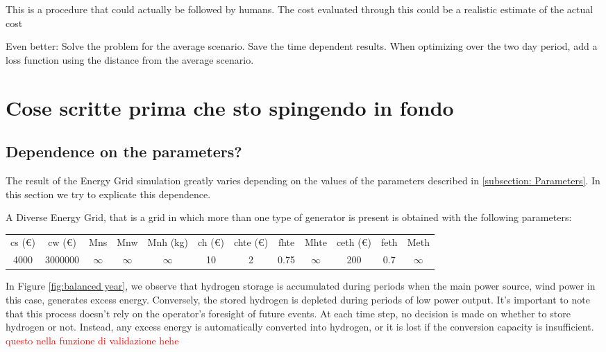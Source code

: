 \documentclass[english]{article}
\numberwithin{definition}{section}
\numberwithin{theorem}{section}
\numberwithin{problem}{section}
\begin{document}
This is a procedure that could actually be followed by humans. The cost evaluated through this could be a realistic estimate of the actual cost

Even better:
Solve the problem for the average scenario. Save the time dependent results. When optimizing over the two day period, add a loss function using the distance from the average scenario.



\newpage
\section{Cose scritte prima che sto spingendo in fondo}
\subsection{Dependence on the parameters?}
The result of the Energy Grid simulation greatly varies depending on the values of the parameters described in \ref{subsection: Parameters}. In this section we try to explicate this dependence.

A Diverse Energy Grid, that is a grid in which more than one type of generator is present is obtained with the following parameters:

\begin{center}
\begin{tabular}{ c c c c c c c c c c c c }

 cs (€)& cw (€)& Mns& Mnw& Mnh (kg)& ch (€)& chte (€)& fhte& Mhte& ceth (€)& feth& Meth \\ 
 4000 & 3000000 & \(\infty\) & \(\infty\) & \(\infty\) & 10 & 2 & 0.75 & \(\infty\) & 200 & 0.7 & \(\infty\) \\  
\end{tabular}
\end{center}

In Figure \ref{fig:balanced year}, we observe that hydrogen storage is accumulated during periods when the main power source, wind power in this case, generates excess energy. Conversely, the stored hydrogen is depleted during periods of low power output. It's important to note that this process doesn't rely on the operator's foresight of future events. At each time step, no decision is made on whether to store hydrogen or not. Instead, any excess energy is automatically converted into hydrogen, or it is lost if the conversion capacity is insufficient. \textcolor{red}{questo nella funzione di validazione hehe}
\end{document}
